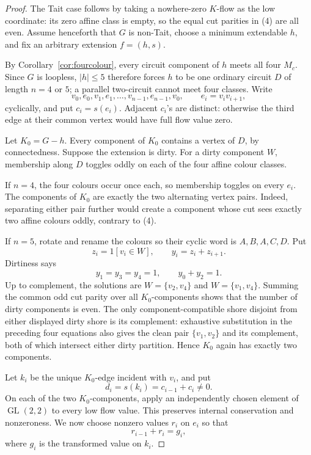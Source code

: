 \documentclass[11pt]{article}
\theoremstyle{definition}
\theoremstyle{remark}
\begin{document}
\begin{proof}
The Tait case follows by taking a nowhere-zero \(K\)-flow as the low
coordinate: its zero affine class is empty, so the equal cut parities in
(4) are all even.  Assume henceforth that \(G\) is non-Tait, choose a
minimum extendable \(h\), and fix an arbitrary extension \(f=(h,s)\).

By Corollary~\ref{cor:fourcolour}, every circuit component of \(h\) meets
all four \(M_c\).  Since \(G\) is loopless, \(|h|\le5\) therefore forces
\(h\) to be one ordinary circuit \(D\) of length \(n=4\) or \(5\); a
parallel two-circuit cannot meet four classes.  Write
\[
 v_0,e_0,v_1,e_1,\ldots,v_{n-1},e_{n-1},v_0,
 \qquad e_i=v_iv_{i+1},
\]
cyclically, and put \(c_i=s(e_i)\).  Adjacent \(c_i\)'s are distinct:
otherwise the third edge at their common vertex would have full flow
value zero.

Let \(K_0=G-h\).  Every component of \(K_0\) contains a vertex of \(D\),
by connectedness.  Suppose the extension is dirty.  For a dirty component
\(W\), membership along \(D\) toggles oddly on each of the four affine
colour classes.

If \(n=4\), the four colours occur once each, so membership toggles on
every \(e_i\).  The components of \(K_0\) are exactly the two alternating
vertex pairs.  Indeed, separating either pair further would create a
component whose cut sees exactly two affine colours oddly, contrary to
(4).

If \(n=5\), rotate and rename the colours so their cyclic word is
\(A,B,A,C,D\).  Put
\[
 z_i=1[v_i\in W],\qquad y_i=z_i+z_{i+1}.
\]
Dirtiness says
\[
 y_1=y_3=y_4=1,\qquad y_0+y_2=1.
\]
Up to complement, the solutions are \(W=\{v_2,v_4\}\) and
\(W=\{v_1,v_4\}\).  Summing the common odd cut parity over all
\(K_0\)-components shows that the number of dirty components is even.
The only component-compatible shore disjoint from either displayed dirty
shore is its complement: exhaustive substitution in the preceding four
equations also gives the clean pair \(\{v_1,v_2\}\) and its complement,
both of which intersect either dirty partition.  Hence \(K_0\) again has
exactly two components.

Let \(k_i\) be the unique \(K_0\)-edge incident with \(v_i\), and put
\[
 d_i=s(k_i)=c_{i-1}+c_i\ne0.
\]
On each of the two \(K_0\)-components, apply an independently chosen
element of \(\operatorname{GL}(2,2)\) to every low flow value.  This
preserves internal conservation and nonzeroness.  We now choose nonzero
values \(r_i\) on \(e_i\) so that
\[
                         r_{i-1}+r_i=g_i,                 \tag{9}
\]
where \(g_i\) is the transformed value on \(k_i\).


\end{proof}
\end{document}

